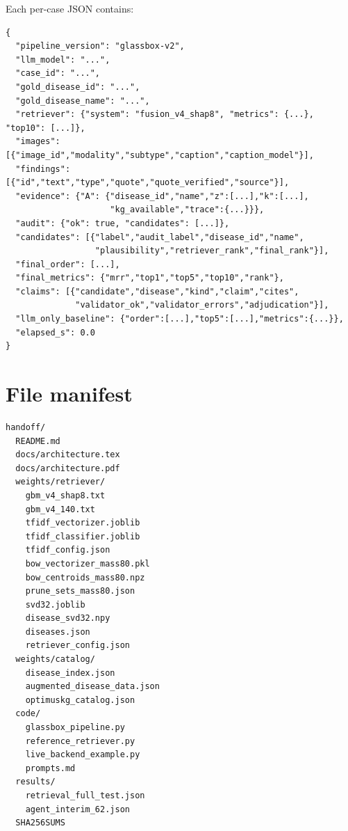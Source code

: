\documentclass[11pt,a4paper]{article}
\begin{document}
Each per-case JSON contains:
\begin{lstlisting}
{
  "pipeline_version": "glassbox-v2",
  "llm_model": "...",
  "case_id": "...",
  "gold_disease_id": "...",
  "gold_disease_name": "...",
  "retriever": {"system": "fusion_v4_shap8", "metrics": {...}, "top10": [...]},
  "images": [{"image_id","modality","subtype","caption","caption_model"}],
  "findings": [{"id","text","type","quote","quote_verified","source"}],
  "evidence": {"A": {"disease_id","name","z":[...],"k":[...],
                     "kg_available","trace":{...}}},
  "audit": {"ok": true, "candidates": [...]},
  "candidates": [{"label","audit_label","disease_id","name",
                  "plausibility","retriever_rank","final_rank"}],
  "final_order": [...],
  "final_metrics": {"mrr","top1","top5","top10","rank"},
  "claims": [{"candidate","disease","kind","claim","cites",
              "validator_ok","validator_errors","adjudication"}],
  "llm_only_baseline": {"order":[...],"top5":[...],"metrics":{...}},
  "elapsed_s": 0.0
}
\end{lstlisting}

\section{File manifest}

\begin{lstlisting}
handoff/
  README.md
  docs/architecture.tex
  docs/architecture.pdf
  weights/retriever/
    gbm_v4_shap8.txt
    gbm_v4_140.txt
    tfidf_vectorizer.joblib
    tfidf_classifier.joblib
    tfidf_config.json
    bow_vectorizer_mass80.pkl
    bow_centroids_mass80.npz
    prune_sets_mass80.json
    svd32.joblib
    disease_svd32.npy
    diseases.json
    retriever_config.json
  weights/catalog/
    disease_index.json
    augmented_disease_data.json
    optimuskg_catalog.json
  code/
    glassbox_pipeline.py
    reference_retriever.py
    live_backend_example.py
    prompts.md
  results/
    retrieval_full_test.json
    agent_interim_62.json
  SHA256SUMS
\end{lstlisting}
\end{document}
